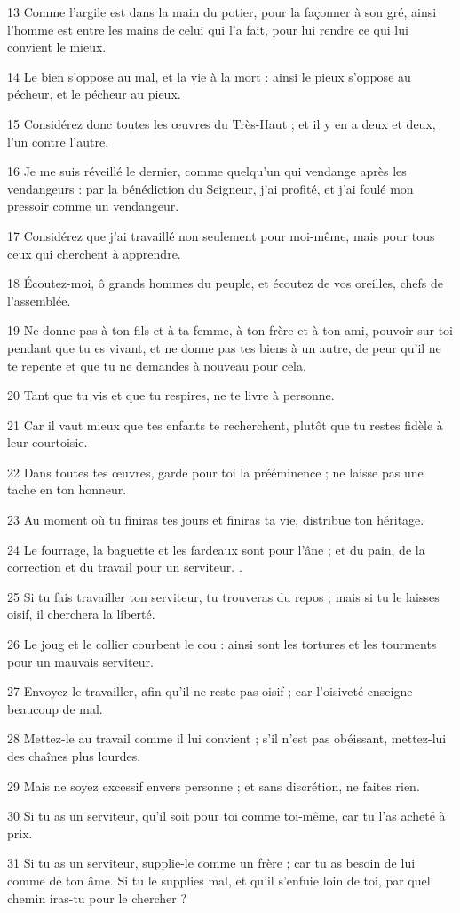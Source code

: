 \par 13 Comme l'argile est dans la main du potier, pour la façonner à son gré, ainsi l'homme est entre les mains de celui qui l'a fait, pour lui rendre ce qui lui convient le mieux.
\par 14 Le bien s'oppose au mal, et la vie à la mort : ainsi le pieux s'oppose au pécheur, et le pécheur au pieux.
\par 15 Considérez donc toutes les œuvres du Très-Haut ; et il y en a deux et deux, l'un contre l'autre.
\par 16 Je me suis réveillé le dernier, comme quelqu'un qui vendange après les vendangeurs : par la bénédiction du Seigneur, j'ai profité, et j'ai foulé mon pressoir comme un vendangeur.
\par 17 Considérez que j'ai travaillé non seulement pour moi-même, mais pour tous ceux qui cherchent à apprendre.
\par 18 Écoutez-moi, ô grands hommes du peuple, et écoutez de vos oreilles, chefs de l'assemblée.
\par 19 Ne donne pas à ton fils et à ta femme, à ton frère et à ton ami, pouvoir sur toi pendant que tu es vivant, et ne donne pas tes biens à un autre, de peur qu'il ne te repente et que tu ne demandes à nouveau pour cela.
\par 20 Tant que tu vis et que tu respires, ne te livre à personne.
\par 21 Car il vaut mieux que tes enfants te recherchent, plutôt que tu restes fidèle à leur courtoisie.
\par 22 Dans toutes tes œuvres, garde pour toi la prééminence ; ne laisse pas une tache en ton honneur.
\par 23 Au moment où tu finiras tes jours et finiras ta vie, distribue ton héritage.
\par 24 Le fourrage, la baguette et les fardeaux sont pour l'âne ; et du pain, de la correction et du travail pour un serviteur. .
\par 25 Si tu fais travailler ton serviteur, tu trouveras du repos ; mais si tu le laisses oisif, il cherchera la liberté.
\par 26 Le joug et le collier courbent le cou : ainsi sont les tortures et les tourments pour un mauvais serviteur.
\par 27 Envoyez-le travailler, afin qu'il ne reste pas oisif ; car l'oisiveté enseigne beaucoup de mal.
\par 28 Mettez-le au travail comme il lui convient ; s'il n'est pas obéissant, mettez-lui des chaînes plus lourdes.
\par 29 Mais ne soyez excessif envers personne ; et sans discrétion, ne faites rien.
\par 30 Si tu as un serviteur, qu'il soit pour toi comme toi-même, car tu l'as acheté à prix.
\par 31 Si tu as un serviteur, supplie-le comme un frère ; car tu as besoin de lui comme de ton âme. Si tu le supplies mal, et qu'il s'enfuie loin de toi, par quel chemin iras-tu pour le chercher ?


